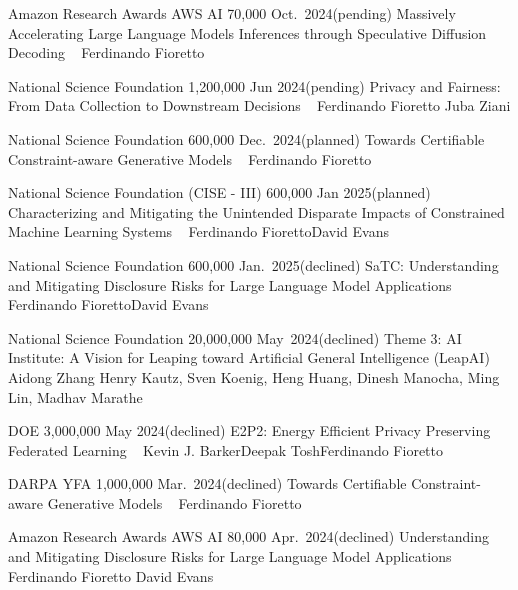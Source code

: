 
\vspace{-16pt}

\begin{projects}
	\grantentrySinglePI
	{Amazon Research Awards AWS AI}
	{70,000}
	{Oct.~2024}{(pending)}
	{Massively Accelerating Large Language Models Inferences through Speculative Diffusion Decoding}
	{~}
	{Ferdinando Fioretto}

	\grantentrycoPI
	{National Science Foundation}
	{1,200,000}
	{Jun 2024}{(pending)}
	{Privacy and Fairness: From Data Collection to Downstream Decisions}
	{~}
	{Ferdinando Fioretto}
	{Juba Ziani}

	\grantentrySinglePI
	{National Science Foundation}
	{600,000}
	{Dec.~2024}{(planned)}
	{Towards Certifiable Constraint-aware Generative Models}
	{~}
	{Ferdinando Fioretto}

	\grantentrycoPI
	{National Science Foundation (CISE - III)}
	{600,000}
	{Jan 2025}{(planned)}
	{Characterizing and Mitigating the Unintended Disparate Impacts of Constrained Machine Learning Systems}
	{~}
	{Ferdinando Fioretto}{David Evans}

	\grantentrycoPI
	{National Science Foundation}
	{600,000}
	{Jan.~2025}{(declined)}
	{SaTC: Understanding and Mitigating Disclosure Risks for Large Language Model Applications}
	{~}
	{Ferdinando Fioretto}{David Evans}

	\grantentrycoPI
	{National Science Foundation}
	{20,000,000}
	{May~2024}{(declined)}
	{Theme 3: AI Institute: A Vision for Leaping toward Artificial General Intelligence (LeapAI)}
	{~}
	{Aidong Zhang}
	{Henry Kautz, Sven Koenig, Heng Huang, Dinesh Manocha, Ming Lin, Madhav Marathe}

	\grantentrycoPI
	{DOE}
	{3,000,000}
	{May 2024}{(declined)}
	{E2P2: Energy Efficient Privacy Preserving Federated Learning}
	{~}
	{Kevin J. Barker}{Deepak Tosh}{Ferdinando Fioretto}

	\grantentrySinglePI
	{DARPA YFA}
	{1,000,000}
	{Mar.~2024}{(declined)}
	{Towards Certifiable Constraint-aware Generative Models}
	{~}
	{Ferdinando Fioretto}

	\grantentrycoPI
	{Amazon Research Awards AWS AI}
	{80,000}
	{Apr.~2024}{(declined)}
	{Understanding and Mitigating Disclosure Risks for Large Language Model Applications}
	{~}
	{Ferdinando Fioretto}
	{David Evans}



\end{projects}
